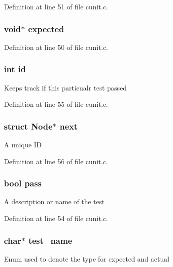 Definition at line 51 of file cunit.\-c.

\hypertarget{struct_node_a61a9460560c0f02cb4e58157d51db0bf}{
\subsubsection[{expected}]{\setlength{\rightskip}{0pt plus 5cm}void$\ast$ expected}}\label{struct_node_a61a9460560c0f02cb4e58157d51db0bf}


Definition at line 50 of file cunit.\-c.

\hypertarget{struct_node_a7441ef0865bcb3db9b8064dd7375c1ea}{
\subsubsection[{id}]{\setlength{\rightskip}{0pt plus 5cm}int id}}\label{struct_node_a7441ef0865bcb3db9b8064dd7375c1ea}
Keeps track if this particualr test passed 

Definition at line 55 of file cunit.\-c.

\hypertarget{struct_node_aa162dd1e0693188a22b1f13b9a2a0ef0}{
\subsubsection[{next}]{\setlength{\rightskip}{0pt plus 5cm}struct {\bf Node}$\ast$ next}}\label{struct_node_aa162dd1e0693188a22b1f13b9a2a0ef0}
A unique I\-D 

Definition at line 56 of file cunit.\-c.

\hypertarget{struct_node_a2d767829f56307840b3cf6e14dd195ff}{
\subsubsection[{pass}]{\setlength{\rightskip}{0pt plus 5cm}bool pass}}\label{struct_node_a2d767829f56307840b3cf6e14dd195ff}
A description or name of the test 

Definition at line 54 of file cunit.\-c.

\hypertarget{struct_node_a8b6908a3aa00c76fb4cabc4807a5c572}{
\subsubsection[{test\-\_\-name}]{\setlength{\rightskip}{0pt plus 5cm}char$\ast$ test\-\_\-name}}\label{struct_node_a8b6908a3aa00c76fb4cabc4807a5c572}
Enum used to denote the type for expected and actual 

